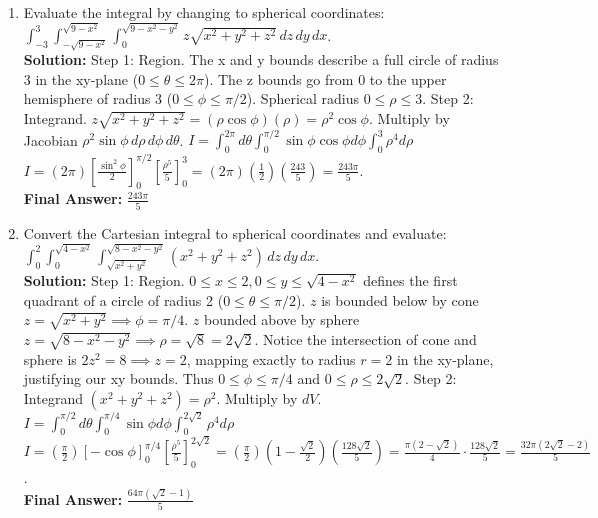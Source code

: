\documentclass[11pt]{article}
\begin{document}
\begin{enumerate}[label=\textbf{\arabic*.}]
\item Evaluate the integral by changing to spherical coordinates: $\int_{-3}^3 \int_{-\sqrt{9-x^2}}^{\sqrt{9-x^2}} \int_0^{\sqrt{9-x^2-y^2}} z \sqrt{x^2+y^2+z^2} \, dz \, dy \, dx$.\\
\textbf{Solution:}
Step 1: Region. The x and y bounds describe a full circle of radius 3 in the xy-plane ($0 \le \theta \le 2\pi$). The z bounds go from $0$ to the upper hemisphere of radius 3 ($0 \le \phi \le \pi/2$). Spherical radius $0 \le \rho \le 3$.
Step 2: Integrand. $z\sqrt{x^2+y^2+z^2} = (\rho\cos\phi)(\rho) = \rho^2\cos\phi$. Multiply by Jacobian $\rho^2\sin\phi \,d\rho \,d\phi \,d\theta$.
$I = \int_0^{2\pi} d\theta \int_0^{\pi/2} \sin\phi\cos\phi d\phi \int_0^3 \rho^4 d\rho$
$I = (2\pi) [\frac{\sin^2\phi}{2}]_0^{\pi/2} [\frac{\rho^5}{5}]_0^3 = (2\pi) (\frac{1}{2}) (\frac{243}{5}) = \frac{243\pi}{5}$.\\
\textbf{Final Answer:} $\frac{243\pi}{5}$

\item Convert the Cartesian integral to spherical coordinates and evaluate: 
$\int_0^2 \int_0^{\sqrt{4-x^2}} \int_{\sqrt{x^2+y^2}}^{\sqrt{8-x^2-y^2}} (x^2+y^2+z^2) \, dz \, dy \, dx$.\\
\textbf{Solution:}
Step 1: Region. $0 \le x \le 2, 0 \le y \le \sqrt{4-x^2}$ defines the first quadrant of a circle of radius 2 ($0 \le \theta \le \pi/2$). 
$z$ is bounded below by cone $z=\sqrt{x^2+y^2} \implies \phi=\pi/4$. 
$z$ bounded above by sphere $z=\sqrt{8-x^2-y^2} \implies \rho=\sqrt{8}=2\sqrt{2}$. 
Notice the intersection of cone and sphere is $2z^2 = 8 \implies z=2$, mapping exactly to radius $r=2$ in the xy-plane, justifying our xy bounds. Thus $0 \le \phi \le \pi/4$ and $0 \le \rho \le 2\sqrt{2}$.
Step 2: Integrand $(x^2+y^2+z^2) = \rho^2$. Multiply by $dV$.
$I = \int_0^{\pi/2} d\theta \int_0^{\pi/4} \sin\phi d\phi \int_0^{2\sqrt{2}} \rho^4 d\rho$
$I = (\frac{\pi}{2}) [-\cos\phi]_0^{\pi/4} [\frac{\rho^5}{5}]_0^{2\sqrt{2}} = (\frac{\pi}{2}) (1 - \frac{\sqrt{2}}{2}) (\frac{128\sqrt{2}}{5}) = \frac{\pi(2-\sqrt{2})}{4} \cdot \frac{128\sqrt{2}}{5} = \frac{32\pi(2\sqrt{2}-2)}{5}$.\\
\textbf{Final Answer:} $\frac{64\pi(\sqrt{2}-1)}{5}$


\end{enumerate}
\end{document}
